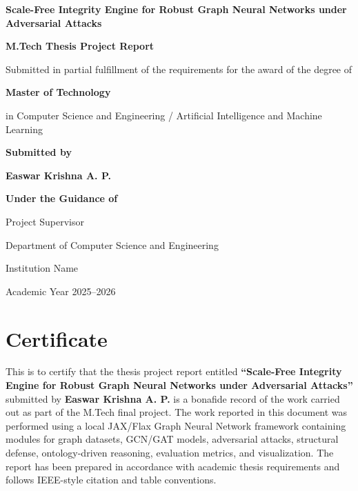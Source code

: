\documentclass[12pt,oneside]{report}
\begin{document}

\begin{titlepage}
\centering
\vspace*{0.4in}
{\fontsize{16}{20}\selectfont\bfseries Scale-Free Integrity Engine for Robust Graph Neural Networks under Adversarial Attacks\par}
\vspace{0.45in}
{\fontsize{14}{17}\selectfont\bfseries M.Tech Thesis Project Report\par}
\vspace{0.35in}
{\fontsize{12}{15}\selectfont Submitted in partial fulfillment of the requirements for the award of the degree of\par}
\vspace{0.2in}
{\fontsize{14}{17}\selectfont\bfseries Master of Technology\par}
\vspace{0.25in}
{\fontsize{12}{15}\selectfont in Computer Science and Engineering / Artificial Intelligence and Machine Learning\par}
\vspace{0.55in}
{\fontsize{12}{15}\selectfont\bfseries Submitted by\par}
\vspace{0.1in}
{\fontsize{14}{17}\selectfont\bfseries Easwar Krishna A. P.\par}
\vspace{0.55in}
{\fontsize{12}{15}\selectfont\bfseries Under the Guidance of\par}
\vspace{0.1in}
{\fontsize{12}{15}\selectfont Project Supervisor\par}
\vfill
{\fontsize{12}{15}\selectfont Department of Computer Science and Engineering\par}
{\fontsize{12}{15}\selectfont Institution Name\par}
{\fontsize{12}{15}\selectfont Academic Year 2025--2026\par}
\end{titlepage}

\chapter*{Certificate}
This is to certify that the thesis project report entitled \textbf{``Scale-Free Integrity Engine for Robust Graph Neural Networks under Adversarial Attacks''} submitted by \textbf{Easwar Krishna A. P.} is a bonafide record of the work carried out as part of the M.Tech final project. The work reported in this document was performed using a local JAX/Flax Graph Neural Network framework containing modules for graph datasets, GCN/GAT models, adversarial attacks, structural defense, ontology-driven reasoning, evaluation metrics, and visualization. The report has been prepared in accordance with academic thesis requirements and follows IEEE-style citation and table conventions.
\end{document}

